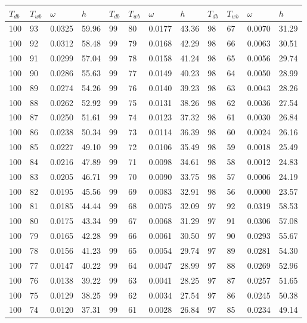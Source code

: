 \begin{tabular}{llll|llll|llll}
 \toprule 
\(T_{db}\) & \(T_{wb}\) & \(\omega\) & \(h\) & \(T_{db}\) & \(T_{wb}\) & \(\omega\) & \(h\) & \(T_{db}\) & \(T_{wb}\) & \(\omega\) & \(h\)  \\ \midrule 
100 & 93 & 0.0325 & 59.96 & 99 & 80 & 0.0177 & 43.36 & 98 & 67 & 0.0070 & 31.29\\
100 & 92 & 0.0312 & 58.48 & 99 & 79 & 0.0168 & 42.29 & 98 & 66 & 0.0063 & 30.51\\
100 & 91 & 0.0299 & 57.04 & 99 & 78 & 0.0158 & 41.24 & 98 & 65 & 0.0056 & 29.74\\
100 & 90 & 0.0286 & 55.63 & 99 & 77 & 0.0149 & 40.23 & 98 & 64 & 0.0050 & 28.99\\
100 & 89 & 0.0274 & 54.26 & 99 & 76 & 0.0140 & 39.23 & 98 & 63 & 0.0043 & 28.26\\
100 & 88 & 0.0262 & 52.92 & 99 & 75 & 0.0131 & 38.26 & 98 & 62 & 0.0036 & 27.54\\
100 & 87 & 0.0250 & 51.61 & 99 & 74 & 0.0123 & 37.32 & 98 & 61 & 0.0030 & 26.84\\
100 & 86 & 0.0238 & 50.34 & 99 & 73 & 0.0114 & 36.39 & 98 & 60 & 0.0024 & 26.16\\
100 & 85 & 0.0227 & 49.10 & 99 & 72 & 0.0106 & 35.49 & 98 & 59 & 0.0018 & 25.49\\
100 & 84 & 0.0216 & 47.89 & 99 & 71 & 0.0098 & 34.61 & 98 & 58 & 0.0012 & 24.83\\
100 & 83 & 0.0205 & 46.71 & 99 & 70 & 0.0090 & 33.75 & 98 & 57 & 0.0006 & 24.19\\
100 & 82 & 0.0195 & 45.56 & 99 & 69 & 0.0083 & 32.91 & 98 & 56 & 0.0000 & 23.57\\
100 & 81 & 0.0185 & 44.44 & 99 & 68 & 0.0075 & 32.09 & 97 & 92 & 0.0319 & 58.53\\
100 & 80 & 0.0175 & 43.34 & 99 & 67 & 0.0068 & 31.29 & 97 & 91 & 0.0306 & 57.08\\
100 & 79 & 0.0165 & 42.28 & 99 & 66 & 0.0061 & 30.50 & 97 & 90 & 0.0293 & 55.67\\
100 & 78 & 0.0156 & 41.23 & 99 & 65 & 0.0054 & 29.74 & 97 & 89 & 0.0281 & 54.30\\
100 & 77 & 0.0147 & 40.22 & 99 & 64 & 0.0047 & 28.99 & 97 & 88 & 0.0269 & 52.96\\
100 & 76 & 0.0138 & 39.22 & 99 & 63 & 0.0041 & 28.25 & 97 & 87 & 0.0257 & 51.65\\
100 & 75 & 0.0129 & 38.25 & 99 & 62 & 0.0034 & 27.54 & 97 & 86 & 0.0245 & 50.38\\
100 & 74 & 0.0120 & 37.31 & 99 & 61 & 0.0028 & 26.84 & 97 & 85 & 0.0234 & 49.14\\

\end{tabular}
